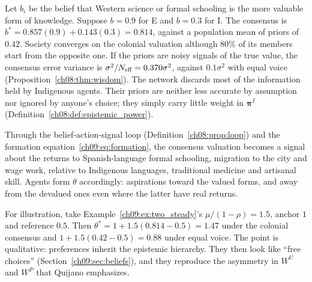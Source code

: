 \documentclass[../solutions_manual.tex]{subfiles}
\begin{document}
 Let $b_i$ be the belief that Western science or formal schooling is the more valuable form of knowledge. Suppose $b = 0.9$ for E and $b = 0.3$ for I. The consensus is $b^* = 0.857(0.9) + 0.143(0.3) = 0.814$, against a population mean of priors of $0.42$. Society converges on the colonial valuation although $80\%$ of its members start from the opposite one. If the priors are noisy signals of the true value, the consensus error variance is $\sigma^2/N_{\text{eff}} = 0.370\sigma^2$, against $0.1\sigma^2$ with equal voice (Proposition~\ref{ch08:thm:wisdom}). The network discards most of the information held by Indigenous agents. Their priors are neither less accurate by assumption nor ignored by anyone's choice; they simply carry little weight in $\boldsymbol{\pi}^I$ (Definition~\ref{ch08:def:epistemic_power}).

 Through the belief-action-signal loop (Definition~\ref{ch08:prop:loop}) and the formation equation~\eqref{ch09:eq:formation}, the consensus valuation becomes a signal about the returns to Spanish-language formal schooling, migration to the city and wage work, relative to Indigenous languages, traditional medicine and artisanal skill. Agents form $\theta$ accordingly: aspirations toward the valued forms, and away from the devalued ones even where the latter have real returns.

For illustration, take Example~\ref{ch09:ex:two_steady}'s $\mu/(1-\rho) = 1.5$, anchor $1$ and reference $0.5$. Then $\theta^* = 1 + 1.5(0.814 - 0.5) = 1.47$ under the colonial consensus and $1 + 1.5(0.42 - 0.5) = 0.88$ under equal voice. The point is qualitative: preferences inherit the epistemic hierarchy. They then look like ``free choices'' (Section~\ref{ch09:sec:beliefs}), and they reproduce the asymmetry in $W^U$ and $W^P$ that Quijano emphasizes.
\end{document}
